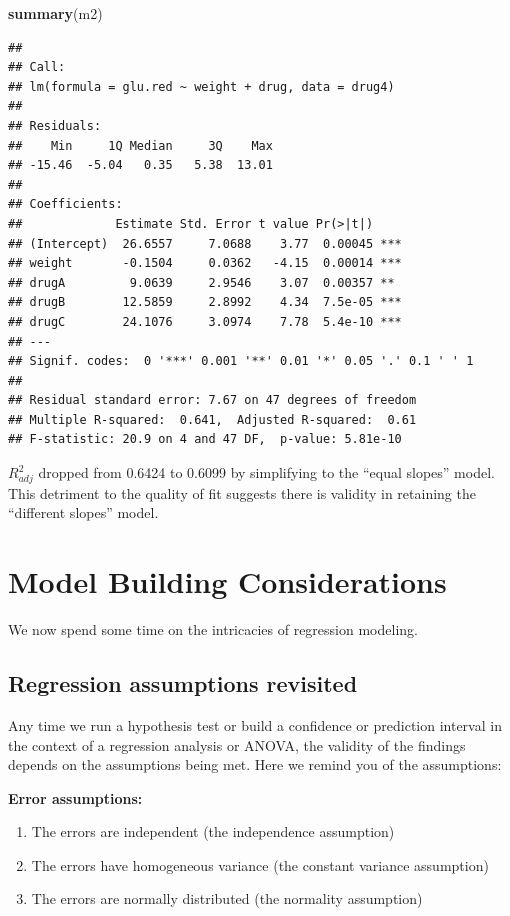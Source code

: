 \documentclass[
]{book}
\newenvironment{Shaded}{\begin{snugshade}}{\end{snugshade}}
\newcommand{\FunctionTok}[1]{\textcolor[rgb]{0.13,0.29,0.53}{\textbf{#1}}}
\newcommand{\NormalTok}[1]{#1}
\providecommand{\tightlist}{%
  \setlength{\itemsep}{0pt}\setlength{\parskip}{0pt}}
\begin{document}
\begin{Shaded}
\begin{Highlighting}[]
\FunctionTok{summary}\NormalTok{(m2)}
\end{Highlighting}
\end{Shaded}

\begin{verbatim}
## 
## Call:
## lm(formula = glu.red ~ weight + drug, data = drug4)
## 
## Residuals:
##    Min     1Q Median     3Q    Max 
## -15.46  -5.04   0.35   5.38  13.01 
## 
## Coefficients:
##             Estimate Std. Error t value Pr(>|t|)    
## (Intercept)  26.6557     7.0688    3.77  0.00045 ***
## weight       -0.1504     0.0362   -4.15  0.00014 ***
## drugA         9.0639     2.9546    3.07  0.00357 ** 
## drugB        12.5859     2.8992    4.34  7.5e-05 ***
## drugC        24.1076     3.0974    7.78  5.4e-10 ***
## ---
## Signif. codes:  0 '***' 0.001 '**' 0.01 '*' 0.05 '.' 0.1 ' ' 1
## 
## Residual standard error: 7.67 on 47 degrees of freedom
## Multiple R-squared:  0.641,  Adjusted R-squared:  0.61 
## F-statistic: 20.9 on 4 and 47 DF,  p-value: 5.81e-10
\end{verbatim}

\(R_{adj}^2\) dropped from 0.6424 to 0.6099 by simplifying to the ``equal slopes'' model. This detriment to the quality of fit suggests there is validity in retaining the ``different slopes'' model.

\hypertarget{model-building-considerations}{%
\chapter{Model Building Considerations}\label{model-building-considerations}}

We now spend some time on the intricacies of regression modeling.

\hypertarget{regression-assumptions-revisited}{%
\section{Regression assumptions revisited}\label{regression-assumptions-revisited}}

Any time we run a hypothesis test or build a confidence or prediction interval in the context of a regression analysis or ANOVA, the validity of the findings depends on the assumptions being met. Here we remind you of the assumptions:

\textbf{Error assumptions:}

\begin{enumerate}
\def\labelenumi{\arabic{enumi}.}
\tightlist
\item
  The errors are independent (the independence assumption)\\
\item
  The errors have homogeneous variance (the constant variance assumption)
\item
  The errors are normally distributed (the normality assumption)
\end{enumerate}
\end{document}
